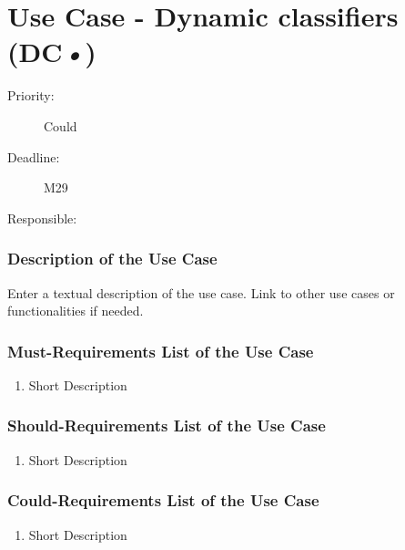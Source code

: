 \newpage
\section{Use Case - Dynamic classifiers (DC\textsl{•})}
\label{UseCase:DC}

\begin{description}
\item[Priority:] Could
\item[Deadline:] M29
\item[Responsible:]
\end{description}

\subsubsection*{Description of the Use Case}

Enter a textual description of the use case. Link to other use cases or functionalities if needed. 


\subsubsection*{Must-Requirements List of the Use Case}

\begin{enumerate}
\item Short Description
\end{enumerate}

\subsubsection*{Should-Requirements List of the Use Case}

\begin{enumerate}
\item Short Description
\end{enumerate}

\subsubsection*{Could-Requirements List of the Use Case}

\begin{enumerate}
\item Short Description
\end{enumerate}


